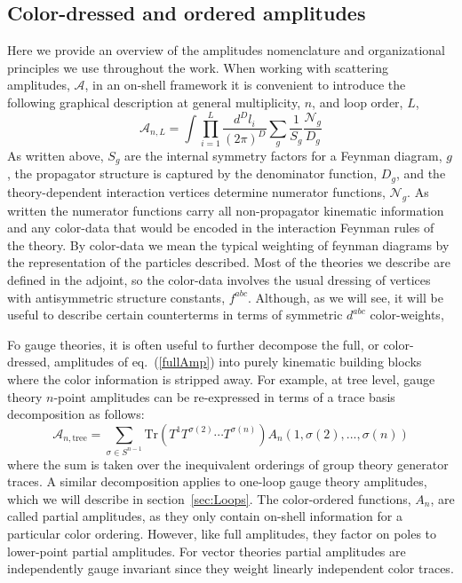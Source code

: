 \documentclass[11pt,letter]{article}
\def\sect#1{section~\ref{#1}}
\def\eqn#1{eq.~(\ref{#1})}
\begin{document}
\subsection{Color-dressed and ordered amplitudes}
Here we provide an overview of the amplitudes nomenclature and organizational principles we use throughout the work. When working with scattering amplitudes, $\mathcal{A}$, in an on-shell framework it is convenient to introduce the following graphical description at general multiplicity, $n$, and loop order, $L$,
\begin{equation}
\label{fullAmp}
\mathcal{A}_{n,L} = \int \prod_{i=1}^L\frac{d^D l_i}{(2\pi)^D} \sum_{g} \frac{1}{S_g}\frac{\mathcal{N}_g}{D_g}
\end{equation}
As written above, $S_g$ are the internal symmetry factors for a Feynman diagram, $g$, the propagator structure is captured by the denominator function, $D_g$, and the theory-dependent interaction vertices determine numerator functions, $\mathcal{N}_g$. As written the numerator functions carry all non-propagator kinematic information and any color-data that would be encoded in the interaction Feynman rules of the theory. By color-data we mean the typical weighting of feynman diagrams by the representation of the particles described.  Most of the theories we describe are defined in the adjoint, so the color-data involves the usual dressing of vertices with  antisymmetric structure constants, $f^{abc}$.  Although, as we will see, it will be useful to describe certain counterterms in terms of symmetric $d^{abc}$ color-weights,

Fo  gauge theories, it is often useful to further decompose the full, or color-dressed, amplitudes of \eqn{fullAmp} into purely kinematic building blocks where the color information is stripped away. For example, at tree level, gauge theory $n$-point amplitudes can be re-expressed in terms of a trace basis decomposition as follows:
\begin{equation}
\mathcal{A}_{n,\text{tree}} = \sum_{\sigma \in S^{n-1}} \text{Tr}(T^1 T^{\sigma(2)}\cdots T^{\sigma(n)}) A_n(1,\sigma(2),...,\sigma(n))
\end{equation}
where the sum is taken over the inequivalent orderings of group theory generator traces. A similar decomposition applies to one-loop gauge theory amplitudes, which we will describe in \sect{sec:Loops}. The color-ordered functions, $A_n$, are called {partial amplitudes}, as they only contain on-shell information for a particular color ordering. However, like full amplitudes, they factor on poles to lower-point partial amplitudes. For vector theories partial amplitudes are independently gauge invariant since they weight linearly independent color traces. 
\end{document}
